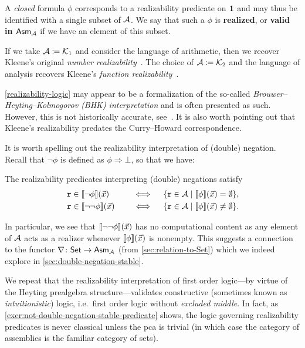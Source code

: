 A \emph{closed} formula \(\phi\) corresponds to a realizability predicate on
\(\One\) and may thus be identified with a single subset of \(\AA\).
%
We say that such a \(\phi\) is \textbf{realized}, or \textbf{valid in
  \(\Asm{\AA}\)} if we have an element of this subset.

If we take \(\AA \coloneqq \Kone\) and consider the language of arithmetic, then
we recover Kleene's original \emph{number realizability}~\cite{Kleene1945}.
%
The choice of \(\AA \coloneqq \Ktwo\) and the language of analysis recovers
Kleene's \emph{function realizability}~\cite{KleeneVesley1965}.
%

\cref{realizability-logic} may appear to be a formalization of the so-called
\emph{Brouwer--Heyting--Kolmogorov (BHK) interpretation} and is often presented
as such. However, this is not historically accurate,
see~\cite[p.~241]{vanOosten2002}. It is also worth pointing out that Kleene's
realizability predates the Curry--Howard correspondence.


It is worth spelling out the realizability interpretation of (double) negation.
%
Recall that \(\lnot\phi\) is defined as \(\phi \Rightarrow \bot\), so that we
have:
\begin{lemma}%
  The realizability predicates interpreting (double) negations satisfy
  \begin{alignat*}{2}
    &\pca{r} \in \sem{\lnot\phi}(\vec x) &&\quad\iff\quad
    \set{\pca{r} \in \AA \mid \sem{\phi}(\vec x) = \emptyset}, \\
    &\pca{r} \in \sem{\lnot\lnot\phi}(\vec x) &&\quad\iff\quad
    \set{\pca{r} \in \AA \mid \sem{\phi}(\vec x) \neq \emptyset}.
  \end{alignat*}
\end{lemma}

In particular, we see that \(\sem{\lnot\lnot\phi}(\vec x)\) has no computational
content as any element of \(\AA\) acts as a realizer whenever
\(\sem{\phi}(\vec x)\) is nonempty.
%
This suggests a connection to the functor \(\nabla \colon \Set \to \Asm{\AA}\)
(from \cref{sec:relation-to-Set}) which we indeed explore in
\cref{sec:double-negation-stable}.

We repeat that the realizability interpretation of first order logic---by virtue
of the Heyting prealgebra structure---validates constructive (sometimes known as
\emph{intuitionistic}) logic, i.e.\ first order logic without \emph{excluded
  middle}.
%
In fact, as \cref{exer:not-double-negation-stable-predicate} shows, the logic
governing realizability predicates is never classical unless the pca is
trivial (in which case the category of assemblies is the familiar category of
sets).

